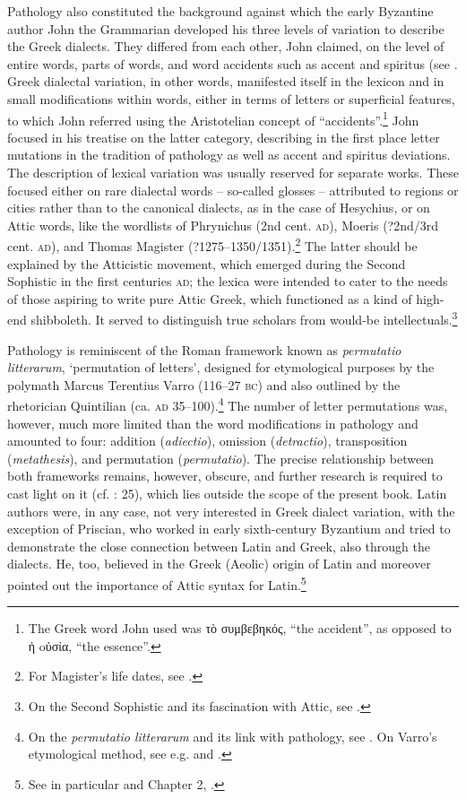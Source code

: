 Pathology also constituted the background against which the early Byzantine author John the Grammarian developed his three levels of variation to describe the Greek dialects. They differed from each other, John claimed, on the level of entire words, parts of words, and word accidents such as accent and spiritus (see \citet[237\textsc{\textsuperscript{r}}]{Manutius1496}. Greek dialectal variation, in other words, manifested itself in the lexicon and in small modifications within words, either in terms of letters or superficial features, to which John referred using the Aristotelian concept of “accidents”.\footnote{The Greek word John used was τὸ συμβεβηκός, “the accident”, as opposed to ἡ oὐσία, “the essence”.} John focused in his treatise on the latter category, describing in the first place letter mutations in the tradition of pathology as well as accent and spiritus deviations. The description of lexical variation was usually reserved for separate works. These focused either on rare dialectal words – so-called glosses – attributed to regions or cities rather than to the canonical dialects, as in the case of Hesychius, or on Attic words, like the wordlists of Phrynichus (2nd cent. \textsc{ad}), Moeris (?2nd/3rd cent. \textsc{ad}), and Thomas Magister (?1275–1350/1351).\footnote{{For Magister’s life dates, see \citet[417]{Baloglou1998}.}} The latter should be explained by the Atticistic movement, which emerged during the Second Sophistic in the first centuries \textsc{ad}; the lexica were intended to cater to the needs of those aspiring to write pure Attic Greek, which functioned as a kind of high-end shibboleth. It served to distinguish true scholars from would-be intellectuals.\footnote{On the Second Sophistic and its fascination with Attic, see \citet{Whitmarsh2005}.}



Pathology is reminiscent of the Roman framework known as \textit{permutatio litterarum}, ‘permutation of letters’, designed for etymological purposes by the polymath Marcus Terentius Varro (116–27 \textsc{bc}) and also outlined by the rhetorician Quintilian (ca. \textsc{ad} 35–100).\footnote{{On the} {\textit{permutatio litterarum} }{and its link with pathology, see \citet[esp. 25–28, 37]{Ax1987}. On Varro’s etymological method, see e.g. \citet{Pfaffel1981} and \citet[7--10, {\textit{passim}}]{Taylor1996}.}} The number of letter permutations was, however, much more limited than the word modifications in pathology and amounted to four: addition (\textit{adiectio}), omission (\textit{detractio}), transposition (\textit{metathesis}), and permutation (\textit{permutatio}). The precise relationship between both frameworks remains, however, obscure, and further research is required to cast light on it (cf. \citealt{Ax1987}: 25), which lies outside the scope of the present book. Latin authors were, in any case, not very interested in Greek dialect variation, with the exception of Priscian, who worked in early sixth-century Byzantium and tried to demonstrate the close connection between Latin and Greek, also through the dialects. He, too, believed in the Greek (Aeolic) origin of Latin and moreover pointed out the importance of Attic syntax for Latin.\footnote{{See in particular \citet[]{Conduche_latin_nodate} and Chapter 2, .}}


